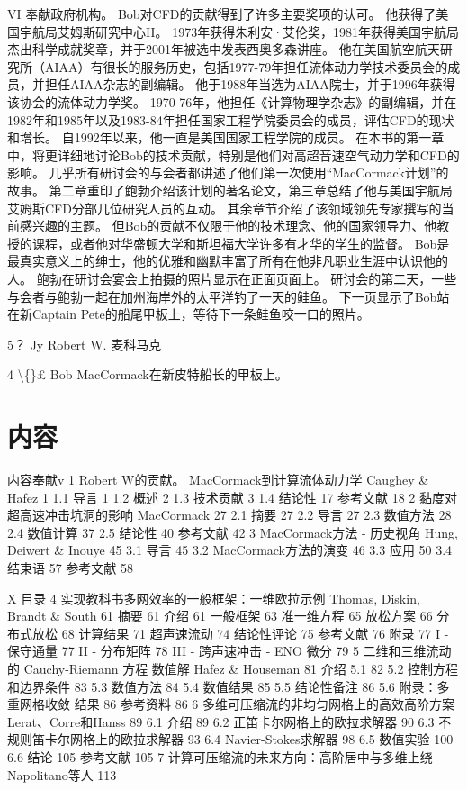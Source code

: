 \documentclass[UTF8,11pt,a4paper,openany,fontset=fandol]{ctexbook}
\begin{document}
VI 奉献政府机构。 Bob对CFD的贡献得到了许多主要奖项的认可。 他获得了美国宇航局艾姆斯研究中心H。 1973年获得朱利安·艾伦奖，1981年获得美国宇航局杰出科学成就奖章，并于2001年被选中发表西奥多森讲座。 他在美国航空航天研究所（AIAA）有很长的服务历史，包括1977-79年担任流体动力学技术委员会的成员，并担任AIAA杂志的副编辑。 他于1988年当选为AIAA院士，并于1996年获得该协会的流体动力学奖。 1970-76年，他担任《计算物理学杂志》的副编辑，并在1982年和1985年以及1983-84年担任国家工程学院委员会的成员，评估CFD的现状和增长。 自1992年以来，他一直是美国国家工程学院的成员。 在本书的第一章中，将更详细地讨论Bob的技术贡献，特别是他们对高超音速空气动力学和CFD的影响。 几乎所有研讨会的与会者都讲述了他们第一次使用“MacCormack计划”的故事。 第二章重印了鲍勃介绍该计划的著名论文，第三章总结了他与美国宇航局艾姆斯CFD分部几位研究人员的互动。 其余章节介绍了该领域领先专家撰写的当前感兴趣的主题。 但Bob的贡献不仅限于他的技术理念、他的国家领导力、他教授的课程，或者他对华盛顿大学和斯坦福大学许多有才华的学生的监督。 Bob是最真实意义上的绅士，他的优雅和幽默丰富了所有在他非凡职业生涯中认识他的人。 鲍勃在研讨会宴会上拍摄的照片显示在正面页面上。 研讨会的第二天，一些与会者与鲍勃一起在加州海岸外的太平洋钓了一天的鲑鱼。 下一页显示了Bob站在新Captain Pete的船尾甲板上，等待下一条鲑鱼咬一口的照片。

5？ Jy Robert W. 麦科马克

4 \textbackslash\{\}£ Bob MacCormack在新皮特船长的甲板上。

\chapter*{内容}
内容奉献v 1 Robert W的贡献。 MacCormack到计算流体动力学 Caughey \& Hafez 1 1.1 导言 1 1.2 概述 2 1.3 技术贡献 3 1.4 结论性 17 参考文献 18 2 黏度对超高速冲击坑洞的影响 MacCormack 27 2.1 摘要 27 2.2 导言 27 2.3 数值方法 28 2.4 数值计算 37 2.5 结论性 40 参考文献 42 3 MacCormack方法 - 历史视角 Hung, Deiwert \& Inouye 45 3.1 导言 45 3.2 MacCormack方法的演变 46 3.3 应用 50 3.4 结束语 57 参考文献 58

X 目录 4 实现教科书多网效率的一般框架：一维欧拉示例 Thomas, Diskin, Brandt \& South 61 摘要 61 介绍 61 一般框架 63 准一维方程 65 放松方案 66 分布式放松 68 计算结果 71 超声速流动 74 结论性评论 75 参考文献 76 附录 77 I - 保守通量 77 II - 分布矩阵 78 III - 跨声速冲击 - ENO 微分 79 5 二维和三维流动的 Cauchy-Riemann 方程 数值解 Hafez \& Houseman 81 介绍 5.1 82 5.2 控制方程 和边界条件 83 5.3 数值方法 84 5.4 数值结果 85 5.5 结论性备注 86 5.6 附录：多重网格收敛 结果 86 参考资料 86 6 多维可压缩流的非均匀网格上的高效高阶方案 Lerat、Corre和Hanss 89 6.1 介绍 89 6.2 正笛卡尔网格上的欧拉求解器 90 6.3 不规则笛卡尔网格上的欧拉求解器 93 6.4 Navier-Stokes求解器 98 6.5 数值实验 100 6.6 结论 105 参考文献 105 7 计算可压缩流的未来方向：高阶居中与多维上绕 Napolitano等人 113
\end{document}
